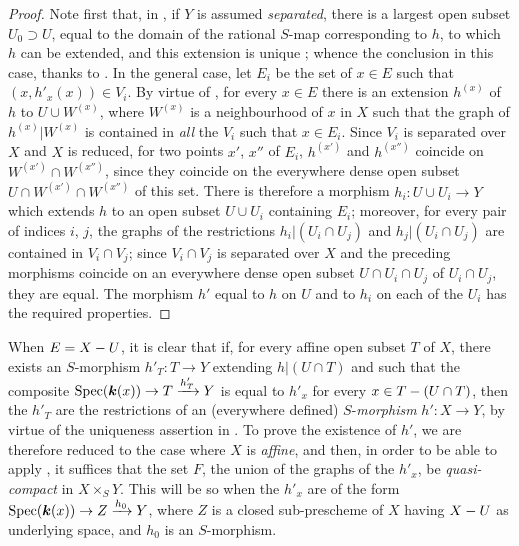 \begin{proof}
Note first that, in , if $Y$ is assumed \emph{separated}, there is a largest open subset $U_0\supset U$, equal to the domain of the rational $S$-map corresponding to $h$, to which $h$ can be extended, and this extension is unique ; whence the conclusion in this case, thanks to .
In the general case, let $E_i$ be the set of $x\in E$ such that $(x,h'_x(x))\in V_i$.
By virtue of , for every $x\in E$ there is an extension $h^{(x)}$ of $h$ to $U\cup W^{(x)}$, where $W^{(x)}$ is a neighbourhood of $x$ in $X$ such that the graph of $h^{(x)}|W^{(x)}$ is contained in \emph{all} the $V_i$ such that $x\in E_i$.
Since $V_i$ is separated over $X$ and $X$ is reduced, for two points $x'$, $x''$ of $E_i$, $h^{(x')}$ and $h^{(x'')}$ coincide on $W^{(x')}\cap W^{(x'')}$, since they
coincide on the everywhere dense open subset $U\cap W^{(x')}\cap W^{(x'')}$ of this set.
There is therefore a morphism $h_i:U\cup U_i\to Y$ which extends $h$ to an open subset $U\cup U_i$ containing $E_i$; moreover, for every pair of indices $i$, $j$, the graphs of the restrictions $h_i|(U_i\cap U_j)$ and $h_j|(U_i\cap U_j)$ are contained in $V_i\cap V_j$; since $V_i\cap V_j$ is separated over $X$ and the preceding morphisms coincide on an everywhere dense open subset $U\cap U_i\cap U_j$ of $U_i\cap U_j$, they are equal.
The morphism $h'$ equal to $h$ on $U$ and to $h_i$ on each of the $U_i$ has the required properties.
\end{proof}

\begin{remark}[20.4.8]
\label{IV.20.4.8}
When $E=X- U$, it is clear that if, for every affine open subset $T$ of $X$, there exists an $S$-morphism $h'_T:T\to Y$ extending $h|(U\cap T)$ and such that the composite $\operatorname{Spec}(\boldsymbol{k}(x))\to T\xrightarrow{h'_T}Y$ is equal to $h'_x$ for every $x\in T-(U\cap T)$, then the $h'_T$ are the restrictions of an (everywhere defined) $S$-\emph{morphism} $h':X\to Y$, by virtue of the uniqueness assertion in .
To prove the existence of $h'$, we are therefore reduced to the case where $X$ is \emph{affine}, and then, in order to be able to apply , it suffices that the set $F$, the union of the graphs of the $h'_x$, be \emph{quasi-compact} in $X\times_S Y$.
This will be so when the $h'_x$ are of the form $\operatorname{Spec}(\boldsymbol{k}(x))\to Z\xrightarrow{h_0}Y$, where $Z$ is a closed sub-prescheme of $X$ having $X- U$ as underlying space, and $h_0$ is an $S$-morphism.
\end{remark}

